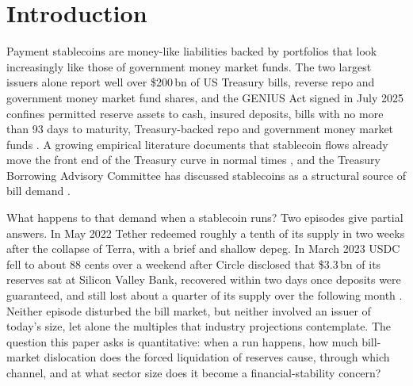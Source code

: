 \section{Introduction}

Payment stablecoins are money-like liabilities backed by portfolios that look increasingly like those of
government money market funds. The two largest issuers alone report well over \$200\,bn of US Treasury bills,
reverse repo and government money market fund shares, and the GENIUS Act signed in July 2025 confines permitted
reserve assets to cash, insured deposits, bills with no more than 93 days to maturity, Treasury-backed repo and
government money market funds \citep[][all institutional figures used in this paper are listed for verification in
the repository]{genius2025}. A growing empirical literature documents that stablecoin flows already move the front
end of the Treasury curve in normal times \citep{ahmed2025}, and the Treasury Borrowing Advisory Committee has
discussed stablecoins as a structural source of bill demand \citep{tbac2025}.

What happens to that demand when a stablecoin runs? Two episodes give partial answers. In May 2022 Tether redeemed
roughly a tenth of its supply in two weeks after the collapse of Terra, with a brief and shallow depeg. In March
2023 USDC fell to about 88 cents over a weekend after Circle disclosed that \$3.3\,bn of its reserves sat at
Silicon Valley Bank, recovered within two days once deposits were guaranteed, and still lost about a quarter of
its supply over the following month \citep{circle2023,tether2022}. Neither episode disturbed the bill market, but
neither involved an issuer of today's size, let alone the multiples that industry projections contemplate. The
question this paper asks is quantitative: when a run happens, how much bill-market dislocation does the forced
liquidation of reserves cause, through which channel, and at what sector size does it become a financial-stability
concern?

